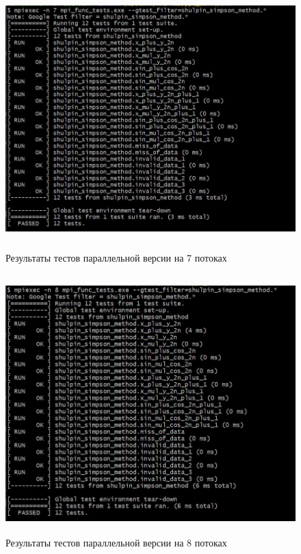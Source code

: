 \documentclass[12pt,a4paper]{article}
\begin{document}
\begin{figure}[H]
\centering
\includegraphics[height=10cm]{img/7nmpitest.jpg}
\caption{\label{fig:visualClass} Результаты тестов параллельной версии на 7 потоках}
\end{figure}

\begin{figure}[H]
\centering
\includegraphics[height=10cm]{img/8nmpitest.jpg}
\caption{\label{fig:visualClass} Результаты тестов параллельной версии на 8 потоках}
\end{figure}
\end{document}
